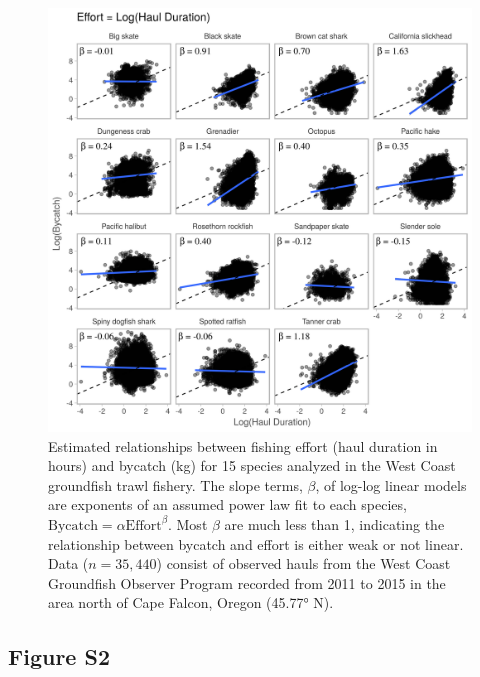 \documentclass[]{article}
\begin{document}
\begin{figure}[H]

{\centering \includegraphics[width=6in]{../../figures/fig2_effort_bycatch/fig2_effort_bycatch_hauldur} 

}

\caption[Estimated relationships between fishing effort (haul duration in hours) and bycatch (kg) for 15 species analyzed in the West Coast groundfish trawl fishery.]{Estimated relationships between fishing effort (haul duration in hours) and bycatch (kg) for 15 species analyzed in the West Coast groundfish trawl fishery. The slope terms, $\beta$, of log-log linear models are exponents of an assumed power law fit to each species, $\text{Bycatch} = \alpha \text{Effort}^{\beta}$. Most $\beta$ are much less than 1, indicating the relationship between bycatch and effort is either weak or not linear. Data ($n = 35,440$) consist of observed hauls from the West Coast Groundfish Observer Program recorded from 2011 to 2015 in the area north of Cape Falcon, Oregon (45.77° N).}\label{fig:effort-bycatch-2}
\end{figure}

\pagebreak

\subsection{Figure S2}\label{figure-s2}
\end{document}

